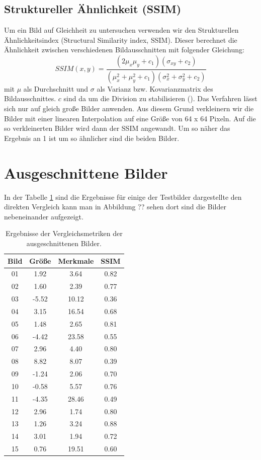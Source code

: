\subsection{Struktureller Ähnlichkeit (SSIM)}
Um ein Bild auf Gleichheit zu untersuchen verwenden wir den Strukturellen Ähnlichkeitsindex (Structural Similarity index, SSIM). Dieser berechnet die Ähnlichkeit zwischen verschiedenen Bildausschnitten mit folgender Gleichung:
$$
SSIM(x,y) = \frac{(2 \mu_x \mu_y + c_1)(\sigma_{xy} + c_2)}{(\mu^2_x + \mu^2_y + c_1)(\sigma^2_x + \sigma^2_y + c_2)}
$$ 
mit $\mu$ als Durchschnitt und $\sigma$ als Varianz bzw. Kovarianzmatrix des Bildausschnittes. $c$ sind da um die Division zu stabilisieren (\cite{Wang2004}). Das Verfahren lässt sich nur auf gleich große Bilder anwenden. Aus diesem Grund verkleinern wir die Bilder mit einer linearen Interpolation auf eine Größe von 64 x 64 Pixeln. Auf die so verkleinerten Bilder wird dann der SSIM angewandt. Um so näher das Ergebnis an 1 ist um so ähnlicher sind die beiden Bilder. 

\section{Ausgeschnittene Bilder}
In der Tabelle \ref{tab:metrics} sind die Ergebnisse für einige der Testbilder dargestellte den direkten Vergleich kann man in Abbildung ?? sehen dort sind die Bilder nebeneinander aufgezeigt. 

\begin{table}[h]
	\centering
	\begin{tabular}{c|ccc}
	Bild & Größe & Merkmale & SSIM \\ \hline 
	01 & 1.92 & 3.64 & 0.82 \\
	02 & 1.60 & 2.39 & 0.77 \\
	03 & -5.52 & 10.12 & 0.36 \\
	04 & 3.15 & 16.54 & 0.68 \\ 
	05 & 1.48 & 2.65 & 0.81 \\ \hline
	06 & -4.42 & 23.58 & 0.55 \\ 
	07 & 2.96 & 4.40 & 0.80 \\
	08 & 8.82 & 8.07 & 0.39 \\
	09 & -1.24 & 2.06 & 0.70 \\
	10 & -0.58 & 5.57 & 0.76 \\ \hline
	11 & -4.35 & 28.46 & 0.49 \\
	12 & 2.96 & 1.74 & 0.80 \\
	13 & 1.26 & 3.24 & 0.88 \\
	14 & 3.01 & 1.94 & 0.72 \\
	15 & 0.76 & 19.51 & 0.60 
	\end{tabular}
	\caption{Ergebnisse der Vergleichsmetriken der ausgeschnittenen Bilder.}
	\label{tab:metrics}
\end{table}


